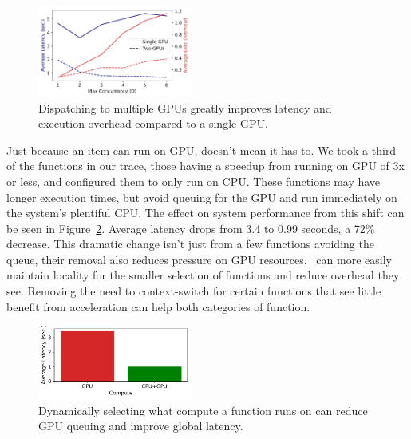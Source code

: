 \begin{figure}
  \includegraphics[width=0.45\textwidth]{../graphs/multi-gpu/25.7/concurr_scale.pdf}
  \vspace*{\captionspace}
  \caption{Dispatching to multiple GPUs greatly improves latency and execution overhead compared to a single GPU.
  }
  \label{fig:multi-gpu}
  \vspace{-0.65cm}
\end{figure}


Just because an item can run on GPU, doesn't mean it has to.
We took a third of the functions in our trace, those having a speedup from running on GPU of 3x or less, and configured them to only run on CPU.
These functions may have longer execution times, but avoid queuing for the GPU and run immediately on the system's plentiful CPU.
The effect on system performance from this shift can be seen in Figure~\ref{fig:poly}.
Average latency drops from 3.4 to 0.99 seconds, a 72\% decrease.
This dramatic change isn't just from a few functions avoiding the queue, their removal also reduces pressure on GPU resources.
\QName~can more easily maintain locality for the smaller selection of functions and reduce overhead they see.
Removing the need to context-switch for certain functions that see little benefit from acceleration can help both categories of function.

\begin{figure}
  \includegraphics[width=0.45\textwidth]{../graphs/polymorphic/25.7/compute_compare_squish_focused.pdf}
  \vspace*{\captionspace}
  \caption{Dynamically selecting what compute a function runs on can reduce GPU queuing and improve global latency.}
  \label{fig:poly}
  \vspace{-0.3cm}
\end{figure}

